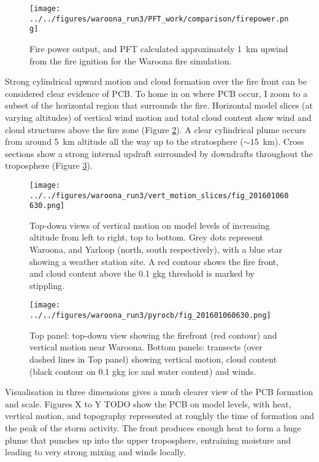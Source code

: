     \begin{figure}
      \texttt{[image: ../../figures/waroona\_run3/PFT\_work/comparison/firepower.png]}
      \caption{%
        Fire power output, and PFT calculated approximately 1~km upwind from the fire ignition for the Waroona fire simulation.
      }
      \label{fig:pcb:waroona:PFT}
    \end{figure}
    
    
    Strong cylindrical upward motion and cloud formation over the fire front can be considered clear evidence of PCB.
    To home in on where PCB occur, I zoom to a subset of the horizontal region that surrounds the fire. Horizontal model slices (at varying altitudes) of vertical wind motion and total cloud content show wind and cloud structures above the fire zone (Figure \ref{fig:pcb:waroona:vert_motion_slices}).
    A clear cylindrical plume occurs from around 5~km altitude all the way up to the stratosphere ($\sim 15$~km).
    Cross sections show a strong internal updraft surrounded by downdrafts throughout the troposphere (Figure \ref{fig:pcb:waroona:pcb_transects}).
    

    \begin{figure}
      \texttt{[image: ../../figures/waroona\_run3/vert\_motion\_slices/fig\_201601060630.png]}
      \caption{%
        Top-down views of vertical motion on model levels of increasing altitude from left to right, top to bottom. 
        Grey dots represent Waroona, and Yarloop (north, south respectively), with a blue star showing a weather station site.
        A red contour shows the fire front, and cloud content above the 0.1 g\/kg threshold is marked by stippling.
        }
      \label{fig:pcb:waroona:vert_motion_slices}
    \end{figure}
    
    \begin{figure}
      \texttt{[image: ../../figures/waroona\_run3/pyrocb/fig\_201601060630.png]}
      \caption{%
        Top panel: top-down view showing the firefront (red contour) and vertical motion near Waroona.
        Bottom panels: transects (over dashed lines in Top panel) showing vertical motion, cloud content (black contour on 0.1 g\/kg ice and water content) and winds.
      }
      \label{fig:pcb:waroona:pcb_transects}
    \end{figure}

    Visualisation in three dimensions gives a much clearer view of the PCB formation and scale. 
    Figures X to Y TODO show the PCB on model levels, with heat, vertical motion, and topography represented at roughly the time of formation and the peak of the storm activity.
    The front produces enough heat to form a huge plume that punches up into the upper troposphere, entraining moisture and leading to very strong mixing and winds locally.

